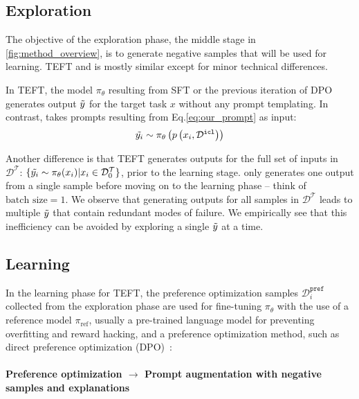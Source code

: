     



\subsection{Exploration}
\label{sec:exploration}

The objective of the exploration phase, the middle stage in \autoref{fig:method_overview}, is to generate negative samples that will be used for learning.
TEFT and \ours is mostly similar except for minor technical differences. 

In TEFT, the model  $\pi_\theta$ resulting from SFT or the previous iteration of DPO generates output $\Tilde{y}$ for the target task $x$ without any prompt templating. 
In contrast, \ours takes prompts resulting from Eq.\ref{eq:our_prompt} as input:
\begin{equation}
\Tilde{y_i}\sim \pi_\theta\left(p\left(x_i, \mathcal{D}^{\texttt{icl}}\right)\right) 
\label{eq:ours_explore}
\end{equation}

Another difference is that TEFT 
generates outputs for the full set of inputs in $\mathcal{D}^{\mathcal{T}}$: 
$\{\Tilde{y_i} \sim \pi_\theta(x_i)
| x_i \in \mathcal{D}^{\mathcal{T}}_0 \}$, prior to the learning stage. 
\ours only generates one output from a single sample before moving on to the learning phase -- think of $\text{batch size}=1$. 
We observe that generating outputs for all samples in $\mathcal{D}^{\mathcal{T}}$ leads to multiple $\Tilde{y}$ that contain redundant modes of failure. 
We empirically see that this inefficiency can be avoided by exploring a single $\Tilde{y}$ at a time. 



\subsection{Learning}
\label{sec:learning}

In the learning phase for TEFT, the preference optimization samples $\mathcal{D}_i^{\texttt{pref}}$ collected from the exploration phase are used for fine-tuning $\pi_\theta$ with the use of a reference model $\pi_{\text{ref}}$, usually a pre-trained language model for preventing overfitting and reward hacking, and a preference optimization method, such as direct preference optimization (DPO)~\cite{rafailov2024direct}:




\paragraph{Preference optimization $\rightarrow$ Prompt augmentation with negative samples and explanations}

